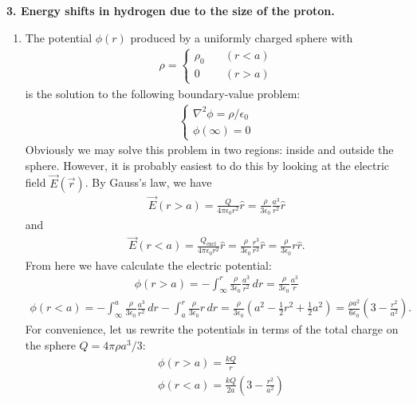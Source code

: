 \documentclass{book}
\theoremstyle{definition}
\newcommand{\f}[2]{\frac{#1}{#2}}
\newcommand{\lp}{\left(}
\newcommand{\rp}{\right)}
\begin{document}
\noindent \textbf{3. Energy shifts in hydrogen due to the size of the proton.}


\begin{enumerate}[label=(\alph*)]
	\item The potential $\phi(r)$ produced by a uniformly charged sphere with
	\begin{align*}
		\rho = \begin{cases}
			\rho_0 &\quad (r<a) \\ 
			0 &\quad (r>a)
		\end{cases}
	\end{align*}
	is the solution to the following boundary-value problem:
	\begin{align*}
		\begin{cases}
			\nabla^2 \phi = \rho/\epsilon_0 \\
			\phi(\infty) = 0
		\end{cases}
	\end{align*}
	Obviously we may solve this problem in two regions: inside and outside the sphere. However, it is probably easiest to do this by looking at the electric field $\vec{E}(\vec{r})$. By Gauss's law, we have
	\begin{align*}
		\vec{E}(r>a) = \f{Q}{4\pi \epsilon_0 r^2} \hat{r} = \f{\rho}{3 \epsilon_0 } \f{a^3}{r^2} \hat{r}
	\end{align*}
	and 
	\begin{align*}
		\vec{E}(r<a) = \f{Q_\text{encl}}{4\pi \epsilon_0 r^2} \hat{r} = \f{\rho}{ 3\epsilon_0} \f{r^3}{r^2} \hat{r} = \f{\rho}{3\epsilon_0} r \hat{r}.
	\end{align*}
	From here we have calculate the electric potential:
	\begin{align*}
		\phi(r>a) = -\int_\infty^r \f{\rho}{3 \epsilon_0 } \f{a^3}{r^2} \,dr = \f{\rho}{3\epsilon_0} \f{a^3}{r}  
	\end{align*}
	\begin{align*}
		\phi(r<a) = -\int_\infty^a \f{\rho}{3 \epsilon_0 } \f{a^3}{r^2} \,dr -\int_a^r \f{\rho}{3\epsilon_0} r\,dr = \f{\rho}{3\epsilon_0} \lp a^2 - \f{1}{2}r^2 + \f{1}{2}a^2 \rp = \f{\rho a^2}{6\epsilon_0} \lp 3 - \f{r^2}{a^2} \rp. 
	\end{align*}
	For convenience, let us rewrite the potentials in terms of the total charge on the sphere $Q = 4\pi \rho a^3/3$:
	\begin{align*}
		&\phi(r>a) = \f{kQ}{r} \\
		&\phi(r<a) = \f{kQ}{2a}\lp 3 - \f{r^2}{a^2} \rp  
	\end{align*}
	

\end{enumerate}
\end{document}
